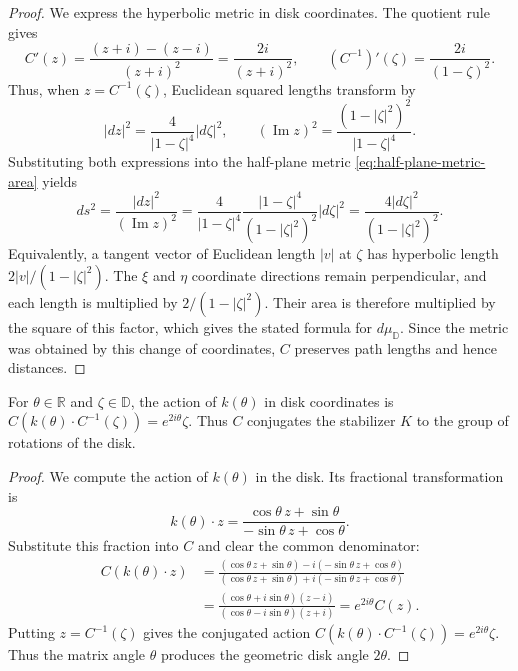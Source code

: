 \begin{proof}
We express the hyperbolic metric in disk coordinates. The quotient rule gives
\[
 C'(z)=\frac{(z+i)-(z-i)}{(z+i)^2}
       =\frac{2i}{(z+i)^2},\qquad
 (C^{-1})'(\zeta)=\frac{2i}{(1-\zeta)^2}.
\]
Thus, when $z=C^{-1}(\zeta)$, Euclidean squared lengths transform by
\[
 |dz|^2=\frac{4}{|1-\zeta|^4}|d\zeta|^2,
 \qquad
 (\operatorname{Im}z)^2=\frac{(1-|\zeta|^2)^2}{|1-\zeta|^4}.
\]
Substituting both expressions into the half-plane metric \eqref{eq:half-plane-metric-area} yields
\[
 ds^2=\frac{|dz|^2}{(\operatorname{Im}z)^2}
 =\frac{4}{|1-\zeta|^4}
   \frac{|1-\zeta|^4}{(1-|\zeta|^2)^2}|d\zeta|^2
 =\frac{4|d\zeta|^2}{(1-|\zeta|^2)^2}.
\]
Equivalently, a tangent vector of Euclidean length $|v|$ at $\zeta$ has hyperbolic length $2|v|/(1-|\zeta|^2)$. The $\xi$ and $\eta$ coordinate directions remain perpendicular, and each length is multiplied by $2/(1-|\zeta|^2)$. Their area is therefore multiplied by the square of this factor, which gives the stated formula for $d\mu_{\mathbb D}$. Since the metric was obtained by this change of coordinates, $C$ preserves path lengths and hence distances.
\end{proof}

\begin{proposition}\label{hyperbolic.disk-rotations}
For $\theta\in\mathbb R$ and $\zeta\in\mathbb D$, the action of $k(\theta)$ in disk coordinates is $C(k(\theta)\cdot C^{-1}(\zeta))=e^{2i\theta}\zeta$. Thus $C$ conjugates the stabilizer $K$ to the group of rotations of the disk.
\end{proposition}

\begin{proof}
We compute the action of $k(\theta)$ in the disk. Its fractional transformation is
\[
 k(\theta)\cdot z
 =\frac{\cos\theta\,z+\sin\theta}{-\sin\theta\,z+\cos\theta}.
\]
Substitute this fraction into $C$ and clear the common denominator:
\begin{equation}\label{eq:cayley-rotation}
 \begin{aligned}
 C(k(\theta)\cdot z)
 &=\frac{(\cos\theta\,z+\sin\theta)
                -i(-\sin\theta\,z+\cos\theta)}
         {(\cos\theta\,z+\sin\theta)
                +i(-\sin\theta\,z+\cos\theta)}\\
 &=\frac{(\cos\theta+i\sin\theta)(z-i)}
         {(\cos\theta-i\sin\theta)(z+i)}
 =e^{2i\theta}C(z).
 \end{aligned}
\end{equation}
Putting $z=C^{-1}(\zeta)$ gives the conjugated action
$C(k(\theta)\cdot C^{-1}(\zeta))=e^{2i\theta}\zeta$. Thus the matrix angle $\theta$ produces the geometric disk angle $2\theta$.
\end{proof}

